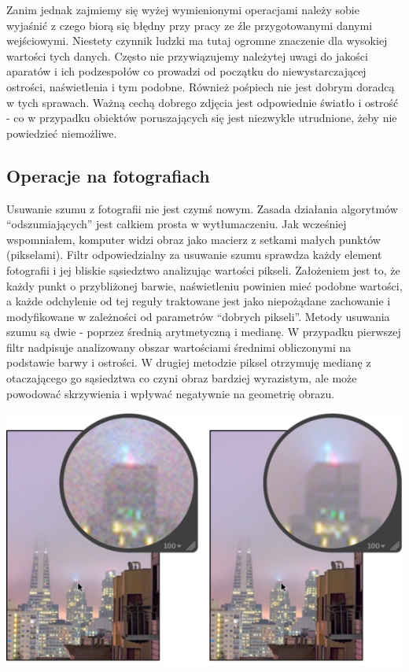 \documentclass{article}
\begin{document}
Zanim jednak zajmiemy się wyżej wymienionymi operacjami należy sobie wyjaśnić z czego biorą się błędny przy pracy ze źle przygotowanymi danymi wejściowymi. Niestety czynnik ludzki ma tutaj ogromne znaczenie dla wysokiej wartości tych danych. Często nie przywiązujemy należytej uwagi do jakości aparatów i ich podzespołów co prowadzi od początku do niewystarczającej ostrości, naświetlenia i tym podobne. Również pośpiech nie jest dobrym doradcą w tych sprawach. Ważną cechą dobrego zdjęcia jest odpowiednie światło i ostrość - co w przypadku obiektów poruszających się jest niezwykle utrudnione, żeby nie powiedzieć niemożliwe. 
\subsection{Operacje na fotografiach}
Usuwanie szumu z fotografii nie jest czymś nowym. Zasada działania algorytmów “odszumiających” jest całkiem prosta w wytłumaczeniu. Jak wcześniej wspomniałem, komputer widzi obraz jako macierz z setkami małych punktów (pikselami). Filtr odpowiedzialny za usuwanie szumu sprawdza każdy element fotografii i jej bliskie sąsiedztwo analizując wartości pikseli. Założeniem jest to, że każdy punkt o przybliżonej barwie, naświetleniu powinien mieć podobne wartości, a każde odchylenie od tej reguły traktowane jest jako niepożądane zachowanie i modyfikowane w zależności od parametrów “dobrych pikseli”. Metody usuwania szumu są dwie - poprzez średnią arytmetyczną i medianę. W przypadku pierwszej filtr nadpisuje analizowany obszar wartościami średnimi obliczonymi na podstawie barwy i ostrości. W drugiej metodzie piksel otrzymuję medianę z otaczającego go sąsiedztwa co czyni obraz bardziej wyrazistym, ale może powodować skrzywienia i wpływać negatywnie na geometrię obrazu.
\begin{center}
\includegraphics[width=15cm]{szum}
\end{center}
\end{document}
